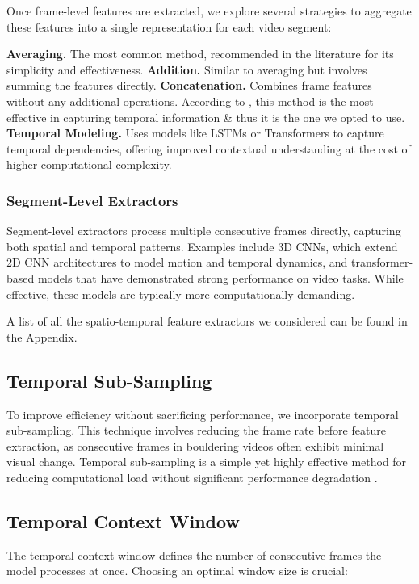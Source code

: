 Once frame-level features are extracted, we explore several strategies to aggregate these features into a single representation for each video segment:

\noindent\textbf{\small{Averaging.}} The most common method, recommended in the literature \cite{dinov2} for its simplicity and effectiveness.
\noindent\textbf{\small{Addition.}} Similar to averaging but involves summing the features directly. 
\noindent\textbf{\small{Concatenation.}} Combines frame features without any additional operations. According to \cite{dinov2}, this method is the most effective in capturing temporal information \& thus it is the one we opted to use.
\noindent\textbf{\small{Temporal Modeling.}} Uses models like LSTMs or Transformers to capture temporal dependencies, offering improved contextual understanding at the cost of higher computational complexity.

\subsubsection{Segment-Level Extractors}
Segment-level extractors process multiple consecutive frames directly, capturing both spatial and temporal patterns. Examples include 3D CNNs, which extend 2D CNN architectures to model motion and temporal dynamics, and transformer-based models that have demonstrated strong performance on video tasks. While effective, these models are typically more computationally demanding.

A list of all the spatio-temporal feature extractors we considered can be found in the Appendix.

\subsection{Temporal Sub-Sampling}
To improve efficiency without sacrificing performance, we incorporate temporal sub-sampling. This technique involves reducing the frame rate before feature extraction, as consecutive frames in bouldering videos often exhibit minimal visual change. Temporal sub-sampling is a simple yet highly effective method for reducing computational load without significant performance degradation \cite{impact-of-temporal-subsampling}.

\subsection{Temporal Context Window}
The temporal context window defines the number of consecutive frames the model processes at once. Choosing an optimal window size is crucial:

